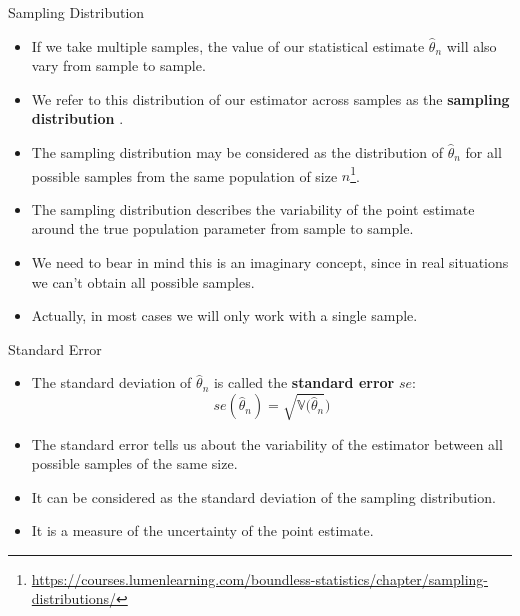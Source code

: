 \documentclass[handout]{beamer}
\begin{document}
\begin{frame}{Sampling Distribution}

\scriptsize{

\begin{itemize}
\item If we take multiple samples, the value of our statistical estimate $\hat{\theta}_n$ will also vary from sample to sample.

\item We refer to this distribution of our estimator across samples as the   \textbf{sampling distribution} \cite{poldrack2019statistical}.

\item The sampling distribution may be considered as the distribution of  $\hat{\theta}_n$ for all possible samples from the same population of size $n$\footnote{\url{https://courses.lumenlearning.com/boundless-statistics/chapter/sampling-distributions/}}.

\item The sampling distribution describes the variability of the point estimate around the true population parameter from sample to sample. 

\item We need to bear in mind this is an imaginary concept, since in real situations we can't obtain all possible samples.

\item Actually, in most cases we will only work with a single sample.

\end{itemize}

} 
\end{frame}


\begin{frame}{Standard Error}

\scriptsize{

\begin{itemize}
\item The standard deviation of $\hat{\theta}_n$ is called the \textbf{standard error} $se$:
\begin{displaymath}
se(\hat{\theta}_n)=\sqrt{\mathbb{V}(\hat{\theta}_n})
\end{displaymath}
\item The standard error tells us about the variability of the estimator between all possible samples of the same size.
\item It can be considered as the standard deviation of the sampling distribution. 
\item It is a measure of the uncertainty of the point estimate.
\end{itemize}

} 
\end{frame}
\end{document}
